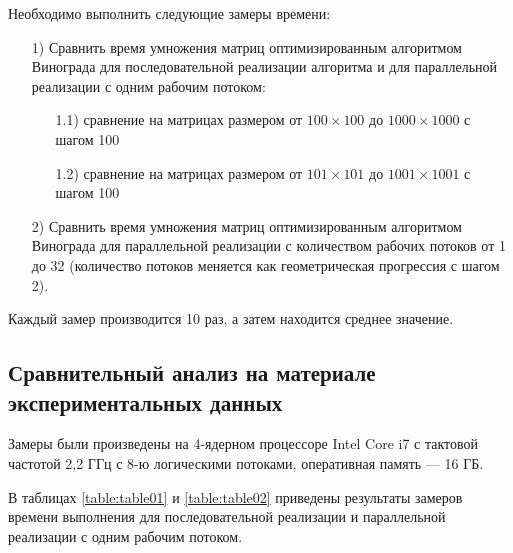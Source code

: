 \documentclass[a4paper,14pt]{article}
\begin{document}
    Необходимо выполнить следующие замеры времени:
    \begin{enumerate} 
        \item[1)] Сравнить время умножения матриц оптимизированным алгоритмом Винограда для последовательной реализации алгоритма и для параллельной реализации с одним рабочим потоком:
        \begin{enumerate}
        \item[1.1)] сравнение на матрицах размером от $100 \times 100$ до $1000 \times 1000$ с шагом 100
        \item[1.2)] сравнение на матрицах размером от $101 \times 101$ до $1001 \times 1001$ с шагом 100
        \end{enumerate}
        \item[2)] Сравнить время умножения матриц оптимизированным алгоритмом Винограда для параллельной реализации с количеством рабочих потоков от 1 до 32 (количество потоков меняется как геометрическая прогрессия с шагом 2).
    \end{enumerate}
    
    Каждый замер производится 10 раз, а затем находится среднее значение. 
    
    
    \subsection{Сравнительный анализ на материале экспериментальных данных}
    	Замеры были произведены на 4-ядерном процессоре Intel Core i7 с тактовой частотой 2,2 ГГц с 8-ю логическими потоками, оперативная память — 16 ГБ.
    	
    	В таблицах \ref{table:table01} и  \ref{table:table02} приведены результаты замеров времени выполнения для последовательной реализации и параллельной реализации с одним рабочим потоком.
    	
\end{document}
